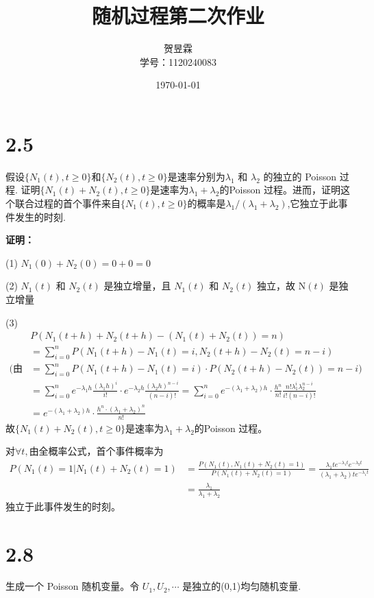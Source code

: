 \documentclass[12pt]{article}
\title{随机过程第二次作业}
\author{贺昱霖 \\ 学号：1120240083}
\date{\today}
\begin{document}
\maketitle

\section*{2.5}
假设$\{N_1(t),t\geqslant0\}$和$\{ N_2(t),t\geqslant0\}$是速率分别为$\lambda_1$ 和 $\lambda_2$ 的独立的 Poisson 过程. 证明$\{{N}_1(t)+N_2(t),t\geq0\}$是速率为\(\lambda_1+\lambda_2\)的Poisson 过程。进而，证明这个联合过程的首个事件来自$\{N_1(t),t\geqslant0\}$的概率是$\lambda_1/(\lambda_1+\lambda_2)$,它独立于此事件发生的时刻.

    \textbf{证明：}

(1) $
N_{1} ( 0)+N_{2} ( 0 )=0+0=0 
$

(2) $N_{1} ( t )$ 和 $N_{2} ( t )$ 是独立增量，且 $N_{1} ( t )$ 和 $N_{2} ( t )$ 独立，故 $\mathrm{N} ( t )$ 是独立增量

(3) $$\begin{aligned}
 & P(N_{1}(t+h)+N_{2}(t+h)-(N_{1}(t)+N_{2}(t))=n) \\
 & =\sum_{i=0}^{n}P(N_{1}(t+h)-N_{1}(t)=i,N_{2}(t+h)-N_{2}(t)=n-i) \\
\text{(由独立性)} & =\sum_{i=0}^{n}P(N_{1}(t+h)-N_{1}(t)=i)\cdot P(N_{2}(t+h)-N_{2}(t))=n-i) \\
 & =\sum_{i=0}^{n}e^{-\lambda_{1}h}\frac{(\lambda_{1}h)^{i}}{i!}\cdot e^{-\lambda_{2}h}\frac{(\lambda_{2}h)^{n-i}}{(n-i)!}=\sum_{i=0}^{n}e^{-(\lambda_{1}+\lambda_{2})h}\cdot\frac{h^{n}}{n!}\frac{n!\lambda_{1}^{i}\lambda_{2}^{n-i}}{i!(n-i)!} \\
 & =e^{-(\lambda_{1}+\lambda_{2})h}\cdot\frac{h^{n}\cdot(\lambda_{1}+\lambda_{2})^{n}}{n!}
\end{aligned}$$
故$\{{N}_1(t)+N_2(t),t\geq0\}$是速率为\(\lambda_1+\lambda_2\)的Poisson 过程。

对\(\forall t,\)由全概率公式，首个事件概率为$$\begin{aligned}
P(N_{1}(t)=1|N_{1}(t)+N_{2}(t)=1) & =\frac{P(N_{1}(t),N_{1}(t)+N_{2}(t)=1)}{P(N_{1}(t)+N_{2}(t)=1)}=\frac{\lambda_{1}te^{-\lambda_{1}t}e^{-\lambda_{2}t}}{(\lambda_{1}+\lambda_{2})te^{-\lambda_{1}t}} \\
 & =\frac{\lambda_{1}}{\lambda_{1}+\lambda_{2}}
\end{aligned}$$
独立于此事件发生的时刻。

\section*{2.8}
生成一个 Poisson 随机变量。令 $U_{1}, U_{2}, \cdots$ 是独立的(0,1)均匀随机变量. 
\end{document}
